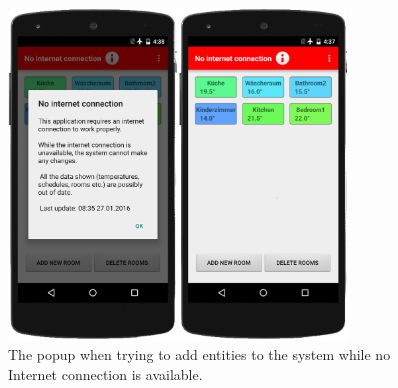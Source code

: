 \begin{figure}
	\begin{center}
		\includegraphics[width=0.8\textwidth]{images/no_internet.png}
	\end{center}
	\caption{The popup when trying to add entities to the system while no Internet connection is available.}
	\label{fig:no_internet}
\end{figure}

